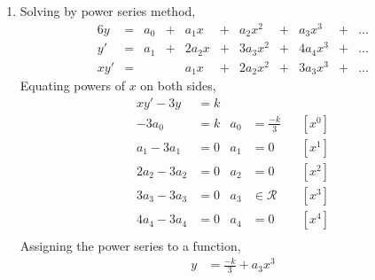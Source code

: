 \begin{enumerate}
    \item Solving by power series method,
          \begin{alignat}{6}
              y     & ={}      & a_0   & {}+{}    & a_1 x  &
              {}+{} & a_2 x^2  & {}+{} & a_3x^3   & {}+{}  & \dots \\
              y'    & ={}      & a_1   & {}+{}    & 2a_2 x &
              {}+{} & 3a_3 x^2 & {}+{} & 4a_4 x^3 & {}+{}  & \dots \\
              xy'   & ={}      &       &          & a_1 x  &
              {}+{} & 2a_2 x^2 & {}+{} & 3a_3 x^3 & {}+{}  & \dots
          \end{alignat}
          Equating powers of $ x $ on both sides, \\
          \begin{align}
              xy' -3y     & = k                         \\
              -3a_0       & = k             &
              a_0         & = \frac{-k}{3}  &   & [x^0] \\
              a_1 - 3a_1  & = 0             &
              a_1         & = 0             &   & [x^1] \\
              2a_2 - 3a_2 & = 0             &
              a_2         & = 0             &   & [x^2] \\
              3a_3 - 3a_3 & = 0             &
              a_3         & \in \mathcal{R} &   & [x^3] \\
              4a_4 - 3a_4 & = 0             &
              a_4         & = 0             &   & [x^4] \\
          \end{align}
          Assigning the power series to a function,
          \begin{align}
              y & = \frac{-k}{3} + a_3 x^3
          \end{align}


\end{enumerate}
